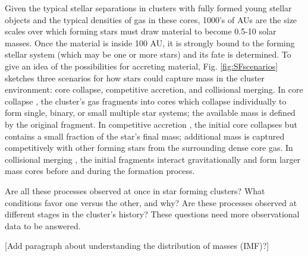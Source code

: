 Given the typical stellar separations in clusters with fully formed young stellar objects and the typical densities of gas in these cores, \num{1000}'s of AUs are the size scales over which forming stars must draw material to become 0.5-10 solar masses. Once the material is inside 100 AU, it is strongly bound to the forming stellar system (which may be one or more stars) and its fate is determined. To give an idea of the possibilities for accreting material, Fig. \ref{fig:SFscenarios} sketches three scenarios for how stars could capture mass in the cluster environment: core collapse, competitive accretion, and collisional merging. In core collapse \citep[Fig.~\ref{scenarios:a},][]{McKee:2003gxa, Myers:2011fy}, the cluster's gas fragments into cores which collapse individually to form single, binary, or small multiple star systems; the available mass is defined by the original fragment. In competitive accretion \citep[Fig.~\ref{scenarios:b},][]{Bonnell:1997vta}, the initial core collapses but contains a small fraction of the star's final mass; additional mass is captured competitively with other forming stars from the surrounding dense core gas. In collisional merging \citep[Fig.~\ref{scenarios:c},][]{Bonnell:2002et}, the initial fragments interact gravitationally and form larger mass cores before and during the formation process. 

Are all these processes observed at once in star forming clusters? What conditions favor one versus the other, and why? Are these processes observed at different stages in the cluster's history? These questions need more observational data to be answered.

[Add paragraph about understanding the distribution of masses (IMF)?]



%
%
%




